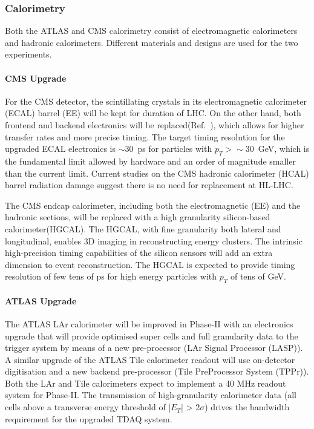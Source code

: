 \subsubsection{Calorimetry} \label{sec:upgradecalo}

Both the ATLAS and CMS calorimetry consist of electromagnetic calorimeters and hadronic calorimeters. Different materials and designs are used for the two experiments. 

\paragraph{CMS Upgrade} 
For the CMS detector, the scintillating crystals in its electromagnetic calorimeter (ECAL) barrel (EE) will be kept for duration of LHC. On the other hand, both frontend and backend electronics will be replaced(Ref.~\cite{Lourenco:2283187}), which allows for higher transfer rates and more precise timing. The target timing resolution for the upgraded ECAL electronics is $\sim30$~ps for particles with $p_T >\sim30$~GeV, which is the fundamental limit allowed by hardware and an order of magnitude smaller than the current limit. 
Current studies on the CMS hadronic calorimeter (HCAL) barrel radiation damage suggest there is no need for replacement at HL-LHC. 

The CMS endcap calorimeter, including both the electromagnetic (EE) and the hadronic sections, will be replaced with a high granularity silicon-based calorimeter(HGCAL). 
The HGCAL, with fine granularity both lateral and longitudinal, enables 3D imaging in reconstructing energy clusters.
The intrinsic high-precision timing capabilities of the silicon sensors will add an extra dimension to event reconstruction. The HGCAL is expected to provide timing resolution of few tens of ps for high energy particles with $p_T$ of tens of GeV. 

\paragraph{ATLAS Upgrade}

The ATLAS LAr calorimeter will be improved in Phase-II with an electronics upgrade that will
provide optimised super cells and full granularity data to the trigger system by means of a
new pre-processor (LAr Signal Processor (LASP)). A similar upgrade of the ATLAS Tile calorimeter
readout will use on-detector digitisation and a new backend pre-processor (Tile PreProcessor
System (TPPr)). Both the LAr and Tile calorimeters expect to implement a 40 MHz
readout system for Phase-II. 
The transmission of high-granularity calorimeter data (all cells above a transverse energy
threshold of |$E_T$| > 2$\sigma$) drives the bandwidth requirement for the upgraded TDAQ system.

